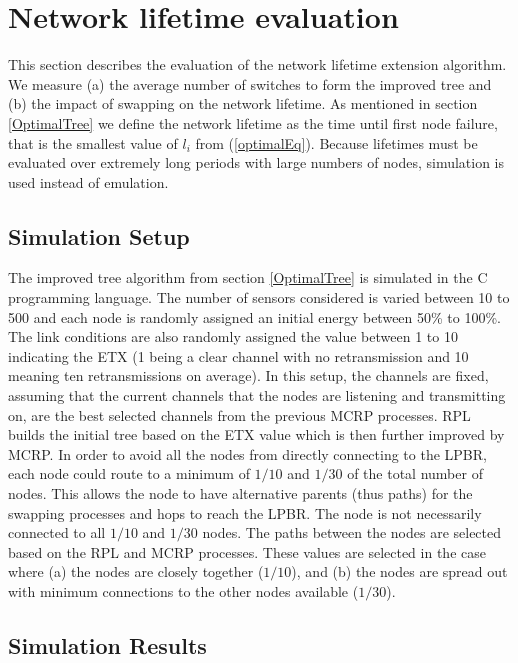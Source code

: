 \section{Network lifetime evaluation}
\label{PerformanceEvaluation}

This section describes the evaluation of the network lifetime extension algorithm.  We measure (a) the average number of switches to form the improved tree and (b) the impact of swapping on the network lifetime.  As mentioned in section \ref{OptimalTree} we define the network lifetime as the time until first node failure, that is the smallest value of $l_i$ from (\ref{optimalEq}).  Because lifetimes must be evaluated over extremely long periods with large numbers of nodes, simulation is used instead of emulation.

\subsection{Simulation Setup}

The improved tree algorithm from section \ref{OptimalTree} is simulated in the C programming language. The number of sensors considered is varied between 10 to 500 and each node is randomly assigned an initial energy between 50\% to 100\%. The link conditions are also randomly assigned the value between 1 to 10 indicating the ETX (1 being a clear channel with no retransmission and 10 meaning ten retransmissions on average). In this setup, the channels are fixed, assuming that the current channels that the nodes are listening and transmitting on, are the best selected channels from the previous MCRP processes. RPL builds the initial tree based on the ETX value which is then further improved by MCRP. In order to avoid all the nodes from directly connecting to the LPBR, each node could route to a minimum of $1/10$ and $1/30$ of the total number of nodes.
This allows the node to have alternative parents (thus paths) for the swapping processes and hops to reach the LPBR. The node is not necessarily connected to all $1/10$ and $1/30$ nodes. The paths between the nodes are selected based on the RPL and MCRP processes. These values are selected in the case where (a) the nodes are closely together ($1/10$), and (b) the nodes are spread out with minimum connections to the other nodes available ($1/30$). 

\subsection{Simulation Results}
